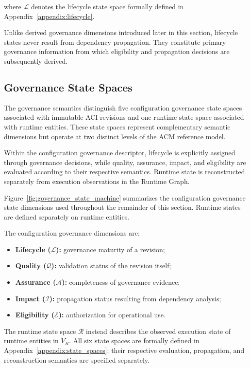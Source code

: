 \documentclass[10pt]{article}
\begin{document}
where $\mathcal{L}$ denotes the lifecycle state space formally defined in Appendix~\ref{appendix:lifecycle}.

Unlike derived governance dimensions introduced later in this section, lifecycle states never result from dependency propagation. They constitute primary governance information from which eligibility and propagation decisions are subsequently derived.

\subsection{Governance State Spaces}
\label{sec:governance_state_spaces}

The governance semantics distinguish five configuration governance state spaces associated with immutable ACI revisions and one runtime state space associated with runtime entities. These state spaces represent complementary semantic dimensions but operate at two distinct levels of the ACM reference model.

Within the configuration governance descriptor, lifecycle is explicitly assigned through governance decisions, while quality, assurance, impact, and eligibility are evaluated according to their respective semantics. Runtime state is reconstructed separately from execution observations in the Runtime Graph.

Figure~\ref{fig:governance_state_machine} summarizes the configuration
governance state dimensions used throughout the remainder of this section.
Runtime states are defined separately on runtime entities.

The configuration governance dimensions are:

\begin{itemize}
	\item \textbf{Lifecycle ($\mathcal{L}$):} governance maturity of a revision;
	\item \textbf{Quality ($\mathcal{Q}$):} validation status of the revision itself;
	\item \textbf{Assurance ($\mathcal{A}$):} completeness of governance evidence;
	\item \textbf{Impact ($\mathcal{I}$):} propagation status resulting from dependency analysis;
	\item \textbf{Eligibility ($\mathcal{E}$):} authorization for operational use.
\end{itemize}

The runtime state space $\mathcal{R}$ instead describes the observed execution
state of runtime entities in $V_R$. All six state spaces are formally defined
in Appendix~\ref{appendix:state_spaces}; their respective evaluation,
propagation, and reconstruction semantics are specified separately.
\end{document}
